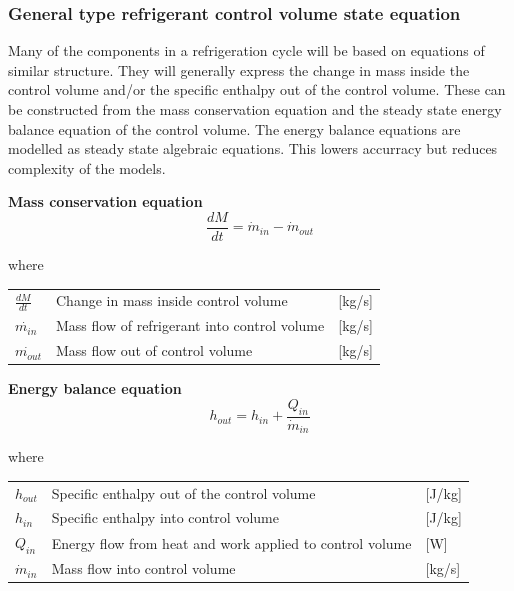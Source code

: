 \subsubsection{General type refrigerant control volume state equation}
Many of the components in a refrigeration cycle will be based on equations of similar structure. They will generally express the change in mass inside the control volume and/or the specific enthalpy out of the control volume. These can be constructed from the mass conservation equation and the steady state energy balance equation of the control volume. The energy balance equations are modelled as steady state algebraic equations. This lowers accurracy but reduces complexity of the models.

\textbf{Mass conservation equation} \\
\begin{equation} \label{eq:GeneralTypeControlVol_MassConservation}
	\frac{dM}{dt} = \dot{m}_{in} - \dot{m}_{out}
\end{equation}

where
\begin{center}
	\begin{tabular}{l p{8cm} l}
		$\frac{dM}{dt}$ 	& Change in mass inside control volume & [\si{kg}/\si{s}]\\
		$\dot{m_{in}}$ 		& Mass flow of refrigerant into control volume & [\si{kg}/\si{s}]\\
		$\dot{m_{out}}$ 	& Mass flow out of control volume & [\si{kg}/\si{s}]\\
	\end{tabular}
\end{center}

\textbf{Energy balance equation}
\begin{equation}
	h_{out} = h_{in} + \frac{Q_{in}}{\dot{m}_{in}}
\end{equation}

where
\begin{center}
	\begin{tabular}{l p{8cm} l}
		$h_{out}$ 		& Specific enthalpy out of the control volume & [\si{J}/\si{kg}]\\
		$h_{in}$ 		& Specific enthalpy into control volume & [\si{J}/\si{kg}]\\
		$Q_{in}$ 		& Energy flow from heat and work applied to control volume & [\si{W}]\\
		$\dot{m}_{in}$ 	& Mass flow into control volume & [\si{kg}/\si{s}]\\
	\end{tabular}
\end{center}

